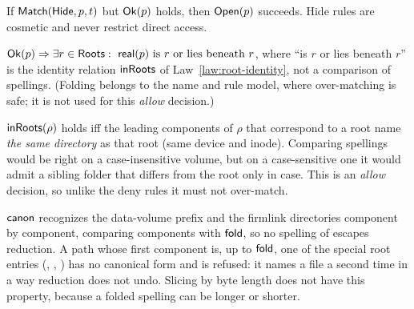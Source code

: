 \begin{law}
\label{law:hidden-reachable}
If $\mathsf{Match}(\mathsf{Hide},p,t)$ but $\mathsf{Ok}(p)$ holds, then $\mathsf{Open}(p)$ succeeds.  Hide rules
are cosmetic and never restrict direct access.
\end{law}

\begin{law}[Containment]
\label{law:containment}
$\Ok(p)\Rightarrow\exists r\in\Roots:\ \Real(p)\text{ is }r\text{ or lies beneath }r$,
where ``is $r$ or lies beneath $r$'' is the identity relation $\mathsf{inRoots}$ of
Law~\ref{law:root-identity}, not a comparison of spellings.  (Folding belongs to
the name and rule model, where over-matching is safe; it is not used for this
\emph{allow} decision.)
\end{law}

\begin{law}
\label{law:root-identity}
$\mathsf{inRoots}(\rho)$ holds iff the leading components of $\rho$ that correspond to a
root name \emph{the same directory} as that root (same device and inode).
Comparing spellings would be right on a case-insensitive volume, but on a
case-sensitive one it would admit a sibling folder that differs from the root
only in case.  This is an \emph{allow} decision, so unlike the deny rules it must
not over-match.
\end{law}

\begin{law}
\label{law:alias-fold}
$\mathsf{canon}$ recognizes the data-volume prefix and the firmlink directories
component by component, comparing components with $\mathsf{fold}$, so no spelling of
 escapes reduction.  A path whose first
component is, up to $\mathsf{fold}$, one of the special root entries
(, , ) has no canonical form and is
refused: it names a file a second time in a way reduction does not undo.  Slicing by byte length
does not have this property, because a folded spelling can be longer or shorter.
\end{law}

